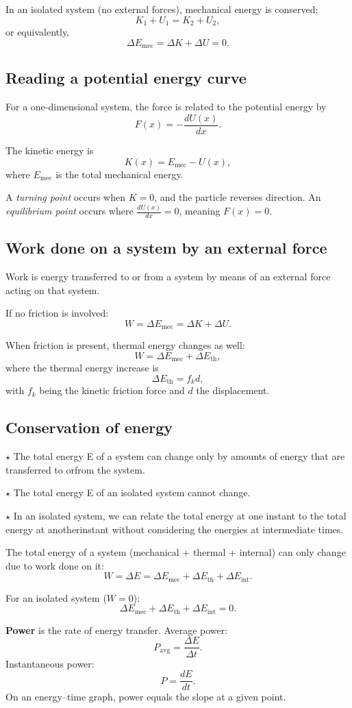 In an isolated system (no external forces), mechanical energy is conserved:
\[
K_1 + U_1 = K_2 + U_2,
\]
or equivalently,
\[
\Delta E_{\text{mec}} = \Delta K + \Delta U = 0.
\]

\subsection{Reading a potential energy curve}
For a one-dimensional system, the force is related to the potential energy by  
\[
F(x) = -\frac{dU(x)}{dx}.
\]

The kinetic energy is  
\[
K(x) = E_{\text{mec}} - U(x),
\]
where \(E_{\text{mec}}\) is the total mechanical energy.

A \textit{turning point} occurs when \(K = 0\), and the particle reverses direction.  
An \textit{equilibrium point} occurs where \(\frac{dU(x)}{dx} = 0\), meaning \(F(x) = 0\).

\subsection{Work done on a system by an external force}
Work is energy transferred to or from a system by means of an external force acting on that system.

If no friction is involved:
\[
W = \Delta E_{\text{mec}} = \Delta K + \Delta U.
\]

When friction is present, thermal energy changes as well:
\[
W = \Delta E_{\text{mec}} + \Delta E_{\text{th}},
\]
where the thermal energy increase is
\[
\Delta E_{\text{th}} = f_k d,
\]
with \(f_k\) being the kinetic friction force and \(d\) the displacement.

\subsection{Conservation of energy}
\noindent $\star$ The total energy E of a system can change only by amounts of energy that are transferred to orfrom the system.

\noindent $\star$ The total energy E of an isolated system cannot change.

\noindent $\star$ In an isolated system, we can relate the total energy at one instant to the total energy at anotherinstant without considering the energies at intermediate times.

The total energy of a system (mechanical + thermal + internal) can only change due to work done on it:
\[
W = \Delta E = \Delta E_{\text{mec}} + \Delta E_{\text{th}} + \Delta E_{\text{int}}.
\]

For an isolated system (\(W = 0\)):
\[
\Delta E_{\text{mec}} + \Delta E_{\text{th}} + \Delta E_{\text{int}} = 0.
\]

\textbf{Power} is the rate of energy transfer.  
Average power:
\[
P_{\text{avg}} = \frac{\Delta E}{\Delta t}.
\]
Instantaneous power:
\[
P = \frac{dE}{dt}.
\]
On an energy–time graph, power equals the slope at a given point.

